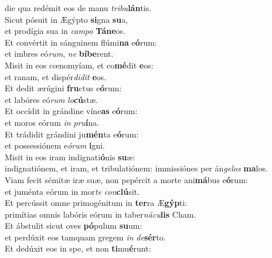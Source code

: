 \oddverse die qua redémit eos de manu \textit{tri}\textit{bu}\textbf{lán}tis.\\
\evenverse Sicut pósuit in Ægýpto \textbf{si}gna \textbf{su}a,~\*\\
\evenverse et prodígia sua in \textit{cam}\textit{po} \textbf{Tá}\textbf{ne}os.\\
\oddverse Et convértit in sánguinem flúmi\textbf{na} e\textbf{ó}rum:~\*\\
\oddverse et imbres eó\textit{rum}, \textit{ne} \textbf{bí}\textbf{be}rent.\\
\evenverse Misit in eos cœnomyíam, et co\textbf{mé}dit \textbf{e}os:~\*\\
\evenverse et ranam, et dispér\textit{di}\textit{dit} \textbf{e}os.\\
\oddverse Et dedit ærúgini \textbf{fru}ctus e\textbf{ó}rum:~\*\\
\oddverse et labóres eó\textit{rum} \textit{lo}\textbf{cú}stæ.\\
\evenverse Et occídit in grándine víne\textbf{as} e\textbf{ó}rum:~\*\\
\evenverse et moros eórum \textit{in} \textit{pru}\textbf{í}na.\\
\oddverse Et trádidit grándini ju\textbf{mén}ta e\textbf{ó}rum:~\*\\
\oddverse et possessiónem e\textit{ó}\textit{rum} \textbf{i}gni.\\
\evenverse Misit in eos iram indignati\textbf{ó}nis \textbf{su}æ:~\*\\
\evenverse indignatiónem, et iram, et tribulatiónem: immissiónes per án\textit{ge}\textit{los} \textbf{ma}los.\\
\oddverse Viam fecit sémitæ iræ suæ, non pepércit a morte ani\textbf{má}bus e\textbf{ó}rum:~\*\\
\oddverse et juménta eórum in mor\textit{te} \textit{con}\textbf{clú}sit.\\
\evenverse Et percússit omne primogénitum in \textbf{ter}ra Æ\textbf{gýp}ti:~\*\\
\evenverse primítias omnis labóris eórum in taber\textit{ná}\textit{cu}\textbf{lis} Cham.\\
\oddverse Et ábstulit sicut oves \textbf{pó}pulum \textbf{su}um:~\*\\
\oddverse et perdúxit eos tamquam gregem \textit{in} \textit{de}\textbf{sér}to.\\
\evenverse Et dedúxit eos in spe, et non \textbf{ti}mu\textbf{é}runt:~\*\\
